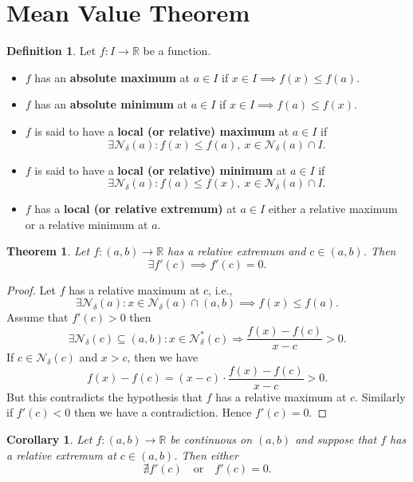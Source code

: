 \documentclass[12pt,openany]{book}
\newtheorem{theorem}{Theorem}[chapter]
\newtheorem{corollary}{Corollary}[theorem]
\theoremstyle{definition}
\newtheorem{definition}{Definition}[chapter]
\newcommand{\R}{\mathbb{R}}
\newcommand{\ie}{\textnormal{i.e.}}
\newcommand{\nbhd}{\mathcal{N}}
\begin{document}
	\newpage
	\section{Mean Value Theorem}
	\begin{tcolorbox}[colback=white,colframe=defcolor,arc=5pt,title={\color{white}\bf }]
		\begin{definition}
			Let $f:I\to\R$ be a function.
			\begin{itemize}
				\item $f$ has an \textbf{absolute maximum} at $a\in I$ if $x\in I\implies f(x)\leq f(a)$.
				\item $f$ has an \textbf{absolute minimum} at $a\in I$ if $x\in I\implies f(a)\leq f(x)$.
				\item $f$ is said to have a \textbf{local (or relative) maximum} at $a\in I$ if \[
				\exists\nbhd_\delta(a):f(x)\leq f(a),\ x\in\nbhd_\delta(a)\cap I.
				\]
				\item $f$ is said to have a \textbf{local (or relative) minimum} at $a\in I$ if \[
				\exists\nbhd_\delta(a):f(a)\leq f(x),\ x\in\nbhd_\delta(a)\cap I.
				\]
				\item $f$ has a \textbf{local (or relative extremum)} at $a\in I$ either a relative maximum or a relative minimum at $a$.
			\end{itemize}
		\end{definition}
	\end{tcolorbox}
	\vspace{8pt}
	\begin{tcolorbox}[colback=white,colframe=thmcolor,arc=5pt,title={\color{white}\bf Interior Extremum Theorem}]
		\begin{theorem}
		Let $f:(a,b)\to\R$ has a relative extremum and $c\in(a,b)$. Then \[
		\exists f'(c)\implies f'(c)=0.
		\]
		\end{theorem}
	\end{tcolorbox}
	\begin{proof}
		Let $f$ has a relative maximum at $c$, \ie, \[
		\exists\nbhd_\delta(a): x\in\nbhd_\delta(a)\cap (a,b)\implies f(x)\leq f(a).
		\] Assume that $f'(c)>0$ then \[
		\exists\nbhd_\delta(c)\subseteq(a,b):x\in\nbhd_\delta^*(c)\Rightarrow\frac{f(x)-f(c)}{x-c}>0.
		\] If $c\in\nbhd_\delta(c)$ and $x>c$, then we have \[
		f(x)-f(c)=(x-c)\cdot\frac{f(x)-f(c)}{x-c}>0.
		\] But this contradicts the hypothesis that $f$ has a relative maximum at $c$. Similarly if $f'(c)<0$ then we have a contradiction. Hence $f'(c)=0$.
	\end{proof}
	\vspace{4pt}
	\begin{tcolorbox}[colback=white,colframe=corcolor,arc=5pt,title={\color{white}\bf }]
		\begin{corollary}
			Let $f:(a,b)\to\R$ be continuous on $(a, b)$ and suppose that $f$ has a relative
			extremum at $c\in(a, b)$. Then either \[
			\nexists f'(c)\quad\text{or}\quad f'(c)=0.
			\]
		\end{corollary}
	\end{tcolorbox}
	\vspace{8pt}
	
\end{document}
